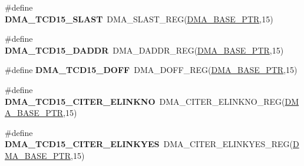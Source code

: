 \begin{DoxyCompactItemize}
\item 
\hypertarget{group___d_m_a___register___accessor___macros_gab67f5b3eb4380c25b5017ac231f273b8}{}\#define {\bfseries D\+M\+A\+\_\+\+T\+C\+D15\+\_\+\+S\+L\+A\+S\+T}~D\+M\+A\+\_\+\+S\+L\+A\+S\+T\+\_\+\+R\+E\+G(\hyperlink{group___d_m_a___peripheral_ga6997fbc1b1973e9f27170217a3bd6f22}{D\+M\+A\+\_\+\+B\+A\+S\+E\+\_\+\+P\+T\+R},15)\label{group___d_m_a___register___accessor___macros_gab67f5b3eb4380c25b5017ac231f273b8}

\item 
\hypertarget{group___d_m_a___register___accessor___macros_ga96883b08084e57c2324a7a945fcc7107}{}\#define {\bfseries D\+M\+A\+\_\+\+T\+C\+D15\+\_\+\+D\+A\+D\+D\+R}~D\+M\+A\+\_\+\+D\+A\+D\+D\+R\+\_\+\+R\+E\+G(\hyperlink{group___d_m_a___peripheral_ga6997fbc1b1973e9f27170217a3bd6f22}{D\+M\+A\+\_\+\+B\+A\+S\+E\+\_\+\+P\+T\+R},15)\label{group___d_m_a___register___accessor___macros_ga96883b08084e57c2324a7a945fcc7107}

\item 
\hypertarget{group___d_m_a___register___accessor___macros_gab3f5f71e56f4d63ef32d03ec031b3b45}{}\#define {\bfseries D\+M\+A\+\_\+\+T\+C\+D15\+\_\+\+D\+O\+F\+F}~D\+M\+A\+\_\+\+D\+O\+F\+F\+\_\+\+R\+E\+G(\hyperlink{group___d_m_a___peripheral_ga6997fbc1b1973e9f27170217a3bd6f22}{D\+M\+A\+\_\+\+B\+A\+S\+E\+\_\+\+P\+T\+R},15)\label{group___d_m_a___register___accessor___macros_gab3f5f71e56f4d63ef32d03ec031b3b45}

\item 
\hypertarget{group___d_m_a___register___accessor___macros_gaa8ed6e0682627b986b2ed3b7a7ccd157}{}\#define {\bfseries D\+M\+A\+\_\+\+T\+C\+D15\+\_\+\+C\+I\+T\+E\+R\+\_\+\+E\+L\+I\+N\+K\+N\+O}~D\+M\+A\+\_\+\+C\+I\+T\+E\+R\+\_\+\+E\+L\+I\+N\+K\+N\+O\+\_\+\+R\+E\+G(\hyperlink{group___d_m_a___peripheral_ga6997fbc1b1973e9f27170217a3bd6f22}{D\+M\+A\+\_\+\+B\+A\+S\+E\+\_\+\+P\+T\+R},15)\label{group___d_m_a___register___accessor___macros_gaa8ed6e0682627b986b2ed3b7a7ccd157}

\item 
\hypertarget{group___d_m_a___register___accessor___macros_ga9b6c6be7d544c5d50b83c331307017f4}{}\#define {\bfseries D\+M\+A\+\_\+\+T\+C\+D15\+\_\+\+C\+I\+T\+E\+R\+\_\+\+E\+L\+I\+N\+K\+Y\+E\+S}~D\+M\+A\+\_\+\+C\+I\+T\+E\+R\+\_\+\+E\+L\+I\+N\+K\+Y\+E\+S\+\_\+\+R\+E\+G(\hyperlink{group___d_m_a___peripheral_ga6997fbc1b1973e9f27170217a3bd6f22}{D\+M\+A\+\_\+\+B\+A\+S\+E\+\_\+\+P\+T\+R},15)\label{group___d_m_a___register___accessor___macros_ga9b6c6be7d544c5d50b83c331307017f4}


\end{DoxyCompactItemize}
